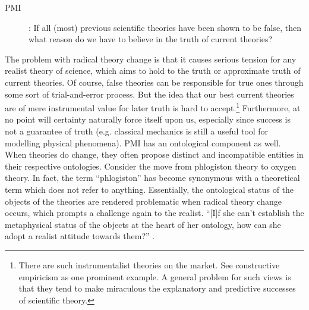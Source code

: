 \documentclass[output=paper]{langscibook}
\begin{document}
\begin{description}
\item[PMI]: If all (most) previous scientific theories have been shown to be false, then what reason do we have to believe in the truth of current theories?
\end{description}

The problem with radical theory change is that it causes serious tension for any realist theory of science, which aims to hold to the truth or approximate truth of current theories. Of course, false theories can be responsible for true ones through some sort of trial-and-error process. But the idea that our best current theories are of mere instrumental value for later truth is hard to accept.\footnote{There are such instrumentalist theories on the market. See \cite{vanFraasen1980} constructive empiricism as one prominent example. A general problem for such views is that they tend to make miraculous the explanatory and predictive successes of scientific theory.} Furthermore, at no point will certainty naturally force itself upon us, especially since success is not a guarantee of truth (e.g. classical mechanics is still a useful tool for modelling physical phenomena). PMI has an ontological component as well. When theories do change, they often propose distinct and incompatible entities in their respective ontologies. Consider the move from phlogiston theory to oxygen theory. In fact, the term ``phlogiston'' has become synonymous with a theoretical term which does not refer to anything. Essentially, the ontological status of the objects of the theories are rendered problematic when radical theory change occurs, which prompts a challenge again to the realist. ``[I]f she can't establish the metaphysical status of the objects at the heart of her ontology, how can she adopt a realist attitude towards them?'' \citep[165]{French2011}.
\end{document}
